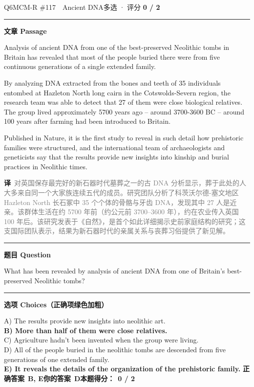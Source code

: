 \documentclass[11pt]{article}
\newcommand{\ptesub}[1]{%
  \par\needspace{2\baselineskip}\smallskip
  {\color{cAccent}\rule[-0.2ex]{3pt}{1.05em}}\hspace{6pt}%
  {\bfseries\color{cHead}#1}\par\nopagebreak\smallskip}
\newcommand{\zh}[1]{{\footnotesize\textcolor{cNote}{\textbf{译}}\ \textcolor{gray}{#1}}}
\begin{document}
\begin{qblock}{Q6\quad MCM-R \#117\ \ Ancient DNA}{多选 · 评分 \textcolor{cAccent}{\bfseries 0 / 2}}
\ptesub{文章 Passage}
\begin{promptbox}
Analysis of ancient DNA from one of the best-preserved Neolithic tombs in Britain has revealed that most of the people buried there were from five continuous generations of a single extended family.

By analyzing DNA extracted from the bones and teeth of 35 individuals entombed at Hazleton North long cairn in the Cotswolds-Severn region, the research team was able to detect that 27 of them were close biological relatives. The group lived approximately 5700 years ago -- around 3700-3600 BC -- around 100 years after farming had been introduced to Britain.

Published in Nature, it is the first study to reveal in such detail how prehistoric families were structured, and the international team of archaeologists and geneticists say that the results provide new insights into kinship and burial practices in Neolithic times.
\end{promptbox}
\zh{对英国保存最完好的新石器时代墓葬之一的古 DNA 分析显示，葬于此处的人大多来自同一个大家族连续五代的成员。研究团队分析了科茨沃尔德-塞文地区 Hazleton North 长石冢中 35 个个体的骨骼与牙齿 DNA，发现其中 27 人是近亲。该群体生活在约 5700 年前（约公元前 3700--3600 年），约在农业传入英国 100 年后。该研究发表于《自然》，是首个如此详细揭示史前家庭结构的研究；这支国际团队表示，结果为新石器时代的亲属关系与丧葬习俗提供了新见解。}
\ptesub{题目 Question}
\begin{notebox}What has been revealed by analysis of ancient DNA from one of Britain's best-preserved Neolithic tombs?\end{notebox}
\ptesub{选项 Choices（正确项绿色加粗）}
{\small
A) The results provide new insights into neolithic art.\\
{\color{cFix}\textbf{B) More than half of them were close relatives.}}\\
C) Agriculture hadn't been invented when the group were living.\\
D) All of the people buried in the neolithic tombs are descended from five generations of one extended family.\\
{\color{cFix}\textbf{E) It reveals the details of the organization of the prehistoric family.}}}
\smallskip
\textbf{正确答案}\ \textcolor{cFix}{\bfseries B, E}\qquad\textbf{你的答案}\ {\color{cWrong}\bfseries D}\qquad\textbf{本题得分：}\ {\color{cAccent}\bfseries 0 / 2}
\end{qblock}
\end{document}

